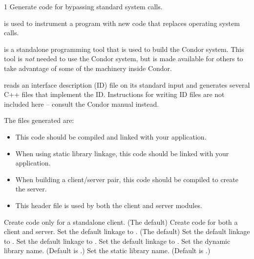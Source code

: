 \begin{ManPage}{\label{man-condor-bypass}}{1}
{Generate code for bypassing standard system calls.}

\Synopsis {}


\Description

 is used to instrument a program with new code that replaces
operating system calls.

 is a standalone programming tool that is used to build
the Condor system.  This tool is {\em not} needed to use the Condor system,
but is made available for others to take advantage of some of the machinery
inside Condor.

 reads an interface description (ID) file on its standard input
and generates several C++ files that implement the ID.  Instructions for
writing ID files are not included here -- consult the Condor manual instead.

The files generated are:

\begin{itemize}
\item[\File{bypass\_client.C}] This code should be compiled and linked with your application.
\item[\File{bypass\_extract.o}] When using static library linkage, this code should be linked with your application.
\item[\File{bypass\_server.C}] When building a client/server pair, this code should be compiled to create the server.
\item[\File{bypass\_global.h}] This header file is used by both the client and server modules.
\end{itemize}

\begin{Options}
 { Create code only for a standalone client. (The default) }
 { Create code for both a client and server. }
 { Set the default linkage to . (The default) }
 { Set the default linkage to . }
 { Set the default linkage to . }
 { Set the default linkage to . }
 { Set the dynamic library name. (Default is .) }
 { Set the static library name.  (Default is .) }
\end{Options}


\end{ManPage}
